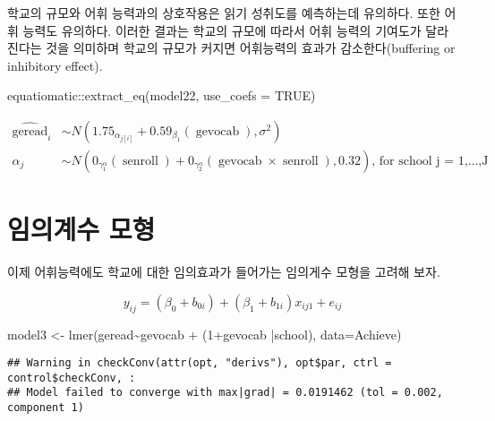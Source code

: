 \documentclass[
]{book}
\newenvironment{Shaded}{\begin{snugshade}}{\end{snugshade}}
\newcommand{\AttributeTok}[1]{\textcolor[rgb]{0.77,0.63,0.00}{#1}}
\newcommand{\ConstantTok}[1]{\textcolor[rgb]{0.00,0.00,0.00}{#1}}
\newcommand{\DecValTok}[1]{\textcolor[rgb]{0.00,0.00,0.81}{#1}}
\newcommand{\FunctionTok}[1]{\textcolor[rgb]{0.00,0.00,0.00}{#1}}
\newcommand{\NormalTok}[1]{#1}
\newcommand{\OtherTok}[1]{\textcolor[rgb]{0.56,0.35,0.01}{#1}}
\newcommand{\SpecialCharTok}[1]{\textcolor[rgb]{0.00,0.00,0.00}{#1}}
\begin{document}
학교의 규모와 어휘 능력과의 상호작용은 읽기 성취도를 예측하는데 유의하다. 또한 어휘 능력도 유의하다. 이러한 결과는 학교의 규모에 따라서 어휘 능력의 기여도가 달라진다는 것을 의미하며 학교의 규모가 커지면 어휘능력의 효과가 감소한다(buffering or inhibitory effect).

\begin{Shaded}
\begin{Highlighting}[]
\NormalTok{equatiomatic}\SpecialCharTok{::}\FunctionTok{extract\_eq}\NormalTok{(model22, }\AttributeTok{use\_coefs =} \ConstantTok{TRUE}\NormalTok{)}
\end{Highlighting}
\end{Shaded}

\[
\begin{aligned}
  \operatorname{\widehat{geread}}_{i}  &\sim N \left(1.75_{\alpha_{j[i]}} + 0.59_{\beta_{1}}(\operatorname{gevocab}), \sigma^2 \right) \\
    \alpha_{j}  &\sim N \left(0_{\gamma_{1}^{\alpha}}(\operatorname{senroll}) + 0_{\gamma_{2}^{\alpha}}(\operatorname{gevocab} \times \operatorname{senroll}), 0.32 \right)
    \text{, for school j = 1,} \dots \text{,J}
\end{aligned}
\]

\hypertarget{uxc784uxc758uxacc4uxc218-uxbaa8uxd615}{%
\section{임의계수 모형}\label{uxc784uxc758uxacc4uxc218-uxbaa8uxd615}}

이제 어휘능력에도 학교에 대한 임의효과가 들어가는 임의게수 모형을 고려해 보자.

\begin{equation}
y_{ij} = (\beta_0 + b_{0i}) + (\beta_1 + b_{1i})  x_{ij1} + e_{ij}
\label{eq:multimodel3}
\end{equation}

\begin{Shaded}
\begin{Highlighting}[]
\NormalTok{model3 }\OtherTok{\textless{}{-}} \FunctionTok{lmer}\NormalTok{(geread}\SpecialCharTok{\textasciitilde{}}\NormalTok{gevocab }\SpecialCharTok{+}\NormalTok{  (}\DecValTok{1}\SpecialCharTok{+}\NormalTok{gevocab }\SpecialCharTok{|}\NormalTok{school), }\AttributeTok{data=}\NormalTok{Achieve)}
\end{Highlighting}
\end{Shaded}

\begin{verbatim}
## Warning in checkConv(attr(opt, "derivs"), opt$par, ctrl = control$checkConv, :
## Model failed to converge with max|grad| = 0.0191462 (tol = 0.002, component 1)
\end{verbatim}
\end{document}
